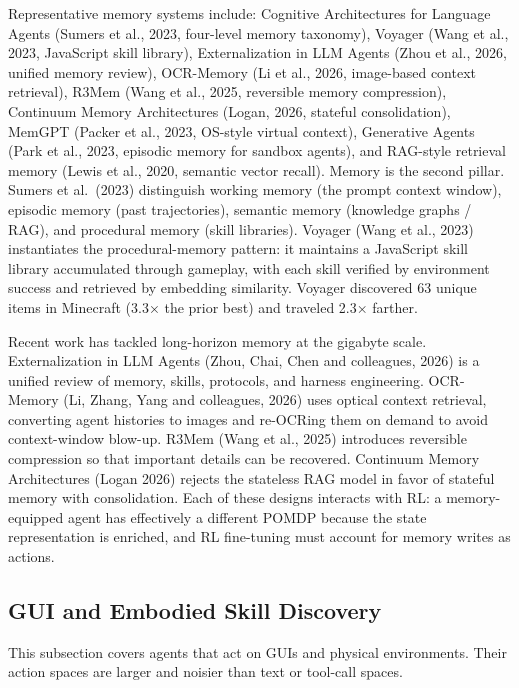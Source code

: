 Representative memory systems include: Cognitive Architectures for Language Agents (Sumers et al., 2023, four-level memory taxonomy), Voyager (Wang et al., 2023, JavaScript skill library), Externalization in LLM Agents (Zhou et al., 2026, unified memory review), OCR-Memory (Li et al., 2026, image-based context retrieval), R3Mem (Wang et al., 2025, reversible memory compression), Continuum Memory Architectures (Logan, 2026, stateful consolidation), MemGPT (Packer et al., 2023, OS-style virtual context), Generative Agents (Park et al., 2023, episodic memory for sandbox agents), and RAG-style retrieval memory (Lewis et al., 2020, semantic vector recall). Memory is the second pillar. Sumers et al.~(2023) distinguish working memory (the prompt context window), episodic memory (past trajectories), semantic memory (knowledge graphs / RAG), and procedural memory (skill libraries). Voyager (Wang et al., 2023) instantiates the procedural-memory pattern: it maintains a JavaScript skill library accumulated through gameplay, with each skill verified by environment success and retrieved by embedding similarity. Voyager discovered 63 unique items in Minecraft (3.3× the prior best) and traveled 2.3× farther.

Recent work has tackled long-horizon memory at the gigabyte scale. Externalization in LLM Agents (Zhou, Chai, Chen and colleagues, 2026) is a unified review of memory, skills, protocols, and harness engineering. OCR-Memory (Li, Zhang, Yang and colleagues, 2026) uses optical context retrieval, converting agent histories to images and re-OCRing them on demand to avoid context-window blow-up. R3Mem (Wang et al., 2025) introduces reversible compression so that important details can be recovered. Continuum Memory Architectures (Logan 2026) rejects the stateless RAG model in favor of stateful memory with consolidation. Each of these designs interacts with RL: a memory-equipped agent has effectively a different POMDP because the state representation is enriched, and RL fine-tuning must account for memory writes as actions.

\subsection{GUI and Embodied Skill Discovery}\label{gui-and-embodied-skill-discovery}

This subsection covers agents that act on GUIs and physical environments. Their action spaces are larger and noisier than text or tool-call spaces.

